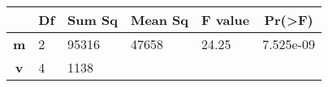 \documentclass[]{article}
\begin{document}
\begin{longtable}[]{@{}cllllc@{}}
\toprule
\begin{minipage}[b]{0.19\columnwidth}\centering
~\strut
\end{minipage} & \begin{minipage}[b]{0.06\columnwidth}\raggedright
Df\strut
\end{minipage} & \begin{minipage}[b]{0.10\columnwidth}\raggedright
Sum Sq\strut
\end{minipage} & \begin{minipage}[b]{0.12\columnwidth}\raggedright
Mean Sq\strut
\end{minipage} & \begin{minipage}[b]{0.12\columnwidth}\raggedright
F value\strut
\end{minipage} & \begin{minipage}[b]{0.14\columnwidth}\centering
Pr(\textgreater{}F)\strut
\end{minipage}\tabularnewline
\midrule
\endhead
\begin{minipage}[t]{0.19\columnwidth}\centering
\textbf{m}\strut
\end{minipage} & \begin{minipage}[t]{0.06\columnwidth}\raggedright
2\strut
\end{minipage} & \begin{minipage}[t]{0.10\columnwidth}\raggedright
95316\strut
\end{minipage} & \begin{minipage}[t]{0.12\columnwidth}\raggedright
47658\strut
\end{minipage} & \begin{minipage}[t]{0.12\columnwidth}\raggedright
24.25\strut
\end{minipage} & \begin{minipage}[t]{0.14\columnwidth}\centering
7.525e-09\strut
\end{minipage}\tabularnewline
\begin{minipage}[t]{0.19\columnwidth}\centering
\textbf{v}\strut
\end{minipage} & \begin{minipage}[t]{0.06\columnwidth}\raggedright
4\strut
\end{minipage} & \begin{minipage}[t]{0.10\columnwidth}\raggedright
1138\strut
\end{minipage} & \begin{minipage}[t]{0.12\columnwidth}\raggedright

\end{minipage}
\end{longtable}
\end{document}
